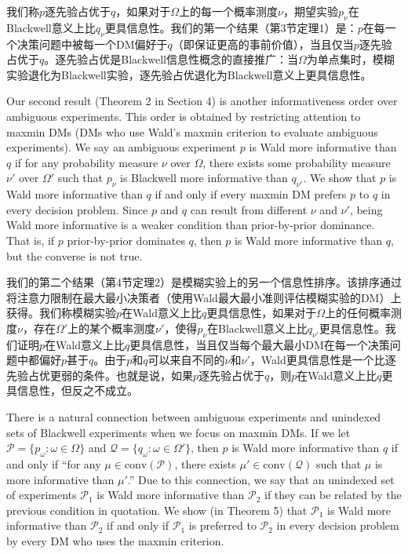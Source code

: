 \documentclass[12pt,a4paper]{article}
\newenvironment{original}
  {\par\vspace{4pt}\noindent\color{black}\ignorespaces}
  {\par\vspace{2pt}}
\newenvironment{translation}
  {\par\vspace{2pt}\noindent\color{myblue}\ignorespaces}
  {\par\vspace{6pt}}
\newcommand{\conv}{\mathrm{conv}}
\begin{document}
\begin{translation}
我们称$p$逐先验占优于$q$，如果对于$\Omega$上的每一个概率测度$\nu$，期望实验$p_{\nu}$在Blackwell意义上比$q_{\nu}$更具信息性。我们的第一个结果（第3节定理1）是：$p$在每一个决策问题中被每一个DM偏好于$q$（即保证更高的事前价值），当且仅当$p$逐先验占优于$q$。逐先验占优是Blackwell信息性概念的直接推广：当$\Omega$为单点集时，模糊实验退化为Blackwell实验，逐先验占优退化为Blackwell意义上更具信息性。
\end{translation}

\begin{original}
Our second result (Theorem 2 in Section 4) is another informativeness order over ambiguous experiments. This order is obtained by restricting attention to maxmin DMs (DMs who use Wald's maxmin criterion to evaluate ambiguous experiments). We say an ambiguous experiment $p$ is Wald more informative than $q$ if for any probability measure $\nu$ over $\Omega$, there exists some probability measure $\nu'$ over $\Omega'$ such that $p_{\nu}$ is Blackwell more informative than $q_{\nu'}$. We show that $p$ is Wald more informative than $q$ if and only if every maxmin DM prefers $p$ to $q$ in every decision problem. Since $p$ and $q$ can result from different $\nu$ and $\nu'$, being Wald more informative is a weaker condition than prior-by-prior dominance. That is, if $p$ prior-by-prior dominates $q$, then $p$ is Wald more informative than $q$, but the converse is not true.
\end{original}

\begin{translation}
我们的第二个结果（第4节定理2）是模糊实验上的另一个信息性排序。该排序通过将注意力限制在最大最小决策者（使用Wald最大最小准则评估模糊实验的DM）上获得。我们称模糊实验$p$在Wald意义上比$q$更具信息性，如果对于$\Omega$上的任何概率测度$\nu$，存在$\Omega'$上的某个概率测度$\nu'$，使得$p_{\nu}$在Blackwell意义上比$q_{\nu'}$更具信息性。我们证明$p$在Wald意义上比$q$更具信息性，当且仅当每个最大最小DM在每一个决策问题中都偏好$p$甚于$q$。由于$p$和$q$可以来自不同的$\nu$和$\nu'$，Wald更具信息性是一个比逐先验占优更弱的条件。也就是说，如果$p$逐先验占优于$q$，则$p$在Wald意义上比$q$更具信息性，但反之不成立。
\end{translation}

\begin{original}
There is a natural connection between ambiguous experiments and unindexed sets of Blackwell experiments when we focus on maxmin DMs. If we let $\mathcal{P}=\{p_{\omega}:\omega\in\Omega\}$ and $\mathcal{Q}=\{q_{\omega}:\omega\in\Omega'\}$, then $p$ is Wald more informative than $q$ if and only if ``for any $\mu\in\conv(\mathcal{P})$, there exists $\mu'\in\conv(\mathcal{Q})$ such that $\mu$ is more informative than $\mu'$.'' Due to this connection, we say that an unindexed set of experiments $\mathcal{P}_1$ is Wald more informative than $\mathcal{P}_2$ if they can be related by the previous condition in quotation. We show (in Theorem 5) that $\mathcal{P}_1$ is Wald more informative than $\mathcal{P}_2$ if and only if $\mathcal{P}_1$ is preferred to $\mathcal{P}_2$ in every decision problem by every DM who uses the maxmin criterion.
\end{original}
\end{document}
